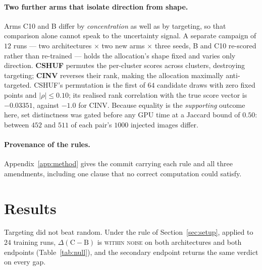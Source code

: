 \documentclass{article} %
\begin{document}
\paragraph{Two further arms that isolate direction from shape.} Arms C10 and B differ by
\emph{concentration} as well as by targeting, so that comparison alone cannot speak to the
uncertainty signal. A separate campaign of $12$ runs --- two architectures $\times$ two new arms
$\times$ three seeds, B and C10 re-scored rather than re-trained --- holds the allocation's shape
fixed and varies only direction. \textbf{CSHUF} permutes the per-cluster scores
across clusters, destroying targeting; \textbf{CINV} reverses their rank, making the allocation
maximally anti-targeted. CSHUF's permutation is the first of $64$ candidate draws with zero fixed points and
$|\rho| \leq 0.10$; its realised rank correlation with the true score vector is $-0.03351$, against
$-1.0$ for CINV. Because equality is the \emph{supporting} outcome here, set
distinctness was gated before any GPU time at a Jaccard bound of $0.50$: between $452$ and $511$ of
each pair's $1000$ injected images differ.

\paragraph{Provenance of the rules.} Appendix~\ref{app:method} gives the commit carrying each rule
and all three amendments, including one clause that no correct computation could satisfy.

\section{Results}
\label{sec:null}

Targeting did not beat random. Under the rule of Section~\ref{sec:setup}, applied to $24$ training
runs, $\Delta(\mathrm{C}-\mathrm{B})$ is \textsc{within noise} on both architectures and both
endpoints (Table~\ref{tab:null}), and the secondary endpoint returns the same verdict on every
gap.
\end{document}
